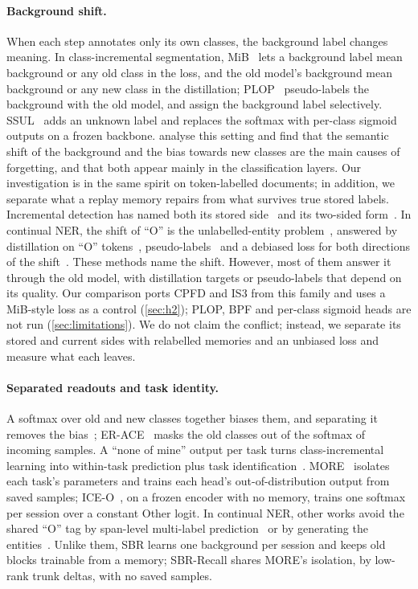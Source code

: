 \documentclass[10pt,twocolumn,letterpaper]{article}
\begin{document}
\paragraph{Background shift.} When each step annotates only its own classes, the background label changes meaning. In class-incremental segmentation, MiB~\citep{cermelli2020mib} lets a background label mean background or any old class in the loss, and the old model's background mean background or any new class in the distillation; PLOP~\citep{douillard2021plop} pseudo-labels the background with the old model, and \citet{park2024mitigating} assign the background label selectively. SSUL~\citep{cha2021ssul} adds an unknown label and replaces the softmax with per-class sigmoid outputs on a frozen backbone. \citet{kalb2022causes} analyse this setting and find that the semantic shift of the background and the bias towards new classes are the main causes of forgetting, and that both appear mainly in the classification layers. Our investigation is in the same spirit on token-labelled documents; in addition, we separate what a replay memory repairs from what survives true stored labels. Incremental detection has named both its stored side~\citep{liu2023abr} and its two-sided form~\citep{mo2024bpf}. In continual NER, the shift of ``O'' is the unlabelled-entity problem~\citep{ma2023learning}, answered by distillation on ``O'' tokens~\citep{monaikul2021extendner,zheng2022cfner}, pseudo-labels~\citep{zhang2023cpfd,zhang2025spt} and a debiased loss for both directions of the shift~\citep{qiu2024is3}. These methods name the shift. However, most of them answer it through the old model, with distillation targets or pseudo-labels that depend on its quality. Our comparison ports CPFD and IS3 from this family and uses a MiB-style loss as a control (\cref{sec:h2}); PLOP, BPF and per-class sigmoid heads are not run (\cref{sec:limitations}). We do not claim the conflict; instead, we separate its stored and current sides with relabelled memories and an unbiased loss and measure what each leaves.

\paragraph{Separated readouts and task identity.} A softmax over old and new classes together biases them, and separating it removes the bias~\citep{ahn2021ssil}; ER-ACE~\citep{caccia2022erace} masks the old classes out of the softmax of incoming samples. A ``none of mine'' output per task turns class-incremental learning into within-task prediction plus task identification~\citep{kim2022theoretical}. MORE~\citep{kim2022more} isolates each task's parameters and trains each head's out-of-distribution output from saved samples; ICE-O~\citep{liu2023ice}, on a frozen encoder with no memory, trains one softmax per session over a constant Other logit. In continual NER, other works avoid the shared ``O'' tag by span-level multi-label prediction~\citep{zhang2023spankl} or by generating the entities~\citep{gencner}. Unlike them, SBR learns one background per session and keeps old blocks trainable from a memory; SBR-Recall shares MORE's isolation, by low-rank trunk deltas, with no saved samples.
\end{document}
